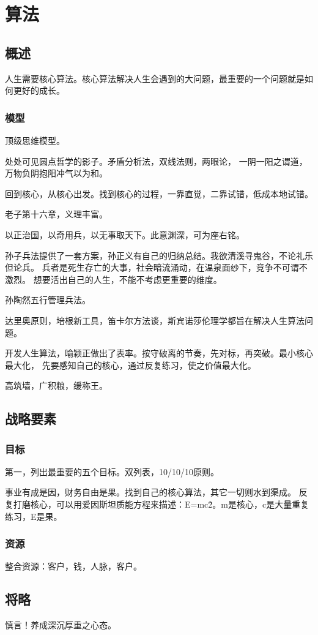 \chapter{算法}

\section{概述}

人生需要核心算法。核心算法解决人生会遇到的大问题，最重要的一个问题就是如何更好的成长。

\subsection{模型}

顶级思维模型。

处处可见圆点哲学的影子。矛盾分析法，双线法则，两眼论，
一阴一阳之谓道，万物负阴抱阳冲气以为和。

回到核心，从核心出发。找到核心的过程，一靠直觉，二靠试错，低成本地试错。

老子第十六章，义理丰富。

以正治国，以奇用兵，以无事取天下。此意渊深，可为座右铭。

孙子兵法提供了一套方案，孙正义有自己的归纳总结。我欲清溪寻鬼谷，不论礼乐但论兵。
兵者是死生存亡的大事，社会暗流涌动，在温泉面纱下，竞争不可谓不激烈。
想要活出自己的人生，不能不考虑更重要的维度。

孙陶然五行管理兵法。

达里奥原则，培根新工具，笛卡尔方法谈，斯宾诺莎伦理学都旨在解决人生算法问题。

开发人生算法，喻颖正做出了表率。按守破离的节奏，先对标，再突破。最小核心最大化，
先要感知自己的核心，通过反复练习，使之价值最大化。

高筑墙，广积粮，缓称王。

\section{战略要素}

\subsection{目标}

第一，列出最重要的五个目标。双列表，10/10/10原则。

事业有成是因，财务自由是果。找到自己的核心算法，其它一切则水到渠成。
反复打磨核心，可以用爱因斯坦质能方程来描述：E=mc\^2。m是核心，c是大量重复练习，E是果。

\subsection{资源}

整合资源：客户，钱，人脉，客户。

\section{将略}

慎言！养成深沉厚重之心态。


